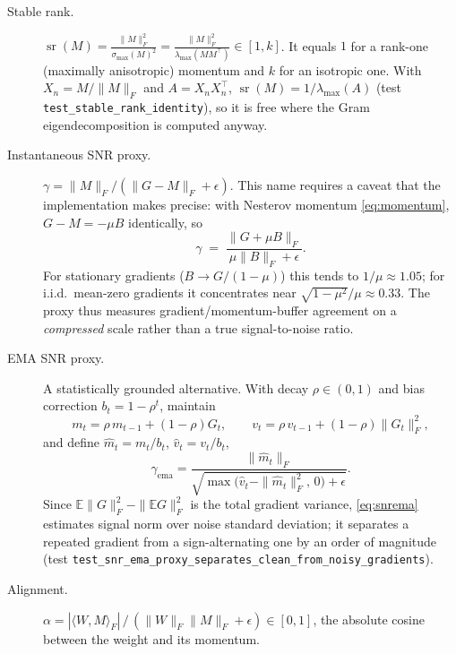 \documentclass{article}
\DeclareMathOperator*{\srank}{sr}
\begin{document}
\begin{description}
\item[Stable rank.] $\displaystyle
\srank(M) = \frac{\|M\|_F^2}{\sigma_{\max}(M)^2}
= \frac{\|M\|_F^2}{\lambda_{\max}(M M^\top)} \in [1, k]$.
It equals $1$ for a rank-one (maximally anisotropic) momentum and $k$ for an
isotropic one. With $X_n = M/\|M\|_F$ and $A = X_n X_n^\top$,
$\srank(M) = 1/\lambda_{\max}(A)$
(test \texttt{test\_stable\_rank\_identity}), so it is free where the Gram
eigendecomposition is computed anyway.

\item[Instantaneous SNR proxy.] $\gamma = \|M\|_F / (\|G - M\|_F + \epsilon)$.
This name requires a caveat that the implementation makes precise: with
Nesterov momentum \eqref{eq:momentum}, $G - M = -\mu B$ identically, so
\begin{equation}
\gamma \;=\; \frac{\|G + \mu B\|_F}{\mu \|B\|_F + \epsilon}.
\end{equation}
For stationary gradients ($B \to G/(1-\mu)$) this tends to
$1/\mu \approx 1.05$; for i.i.d.\ mean-zero gradients it concentrates near
$\sqrt{1-\mu^2}/\mu \approx 0.33$. The proxy thus measures
gradient/momentum-buffer agreement on a \emph{compressed} scale rather than a
true signal-to-noise ratio.

\item[EMA SNR proxy.] A statistically grounded alternative. With decay
$\rho \in (0,1)$ and bias correction $b_t = 1 - \rho^t$, maintain
\begin{equation}
m_t = \rho\, m_{t-1} + (1{-}\rho) G_t, \qquad
v_t = \rho\, v_{t-1} + (1{-}\rho) \|G_t\|_F^2,
\end{equation}
and define $\widehat{m}_t = m_t / b_t$, $\widehat{v}_t = v_t / b_t$,
\begin{equation}
\label{eq:snrema}
\gamma_{\mathrm{ema}} = \frac{\|\widehat m_t\|_F}
{\sqrt{\max\bigl(\widehat v_t - \|\widehat m_t\|_F^2,\, 0\bigr) + \epsilon}} .
\end{equation}
Since $\mathbb{E}\|G\|_F^2 - \|\mathbb{E}G\|_F^2$ is the total gradient
variance, \eqref{eq:snrema} estimates signal norm over noise standard
deviation; it separates a repeated gradient from a sign-alternating one by an
order of magnitude (test
\texttt{test\_snr\_ema\_proxy\_separates\_clean\_from\_noisy\_gradients}).

\item[Alignment.] $\alpha = |\langle W, M\rangle_F| \,/\,
(\|W\|_F \|M\|_F + \epsilon) \in [0, 1]$, the absolute cosine between the
weight and its momentum.
\end{description}
\end{document}
